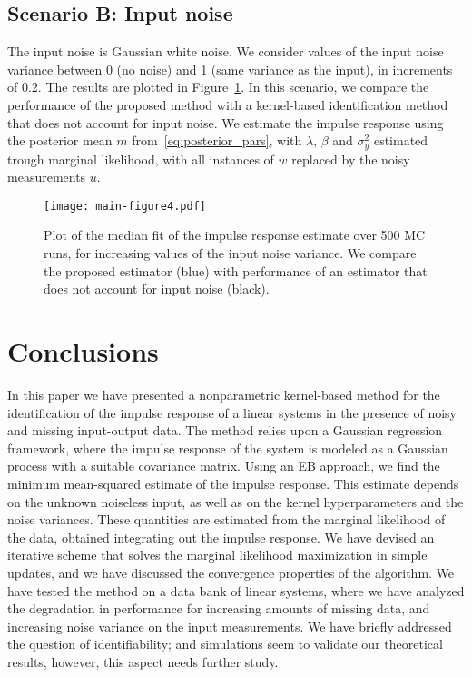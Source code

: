 \documentclass[10pt]{article}
\begin{document}
\subsection*{Scenario B\@: Input noise}
The input noise is Gaussian white noise. We consider values of the input noise
variance between 0 (no noise) and 1 (same variance as the input), in increments
of 0.2. The results are plotted in Figure~\ref{fig:scenario_b}. In this
scenario, we compare the performance of the proposed method with a kernel-based
identification method that does not account for input noise. We estimate the
impulse response using the posterior mean $m$ from~\eqref{eq:posterior_pars},
with $\lambda$, $\beta$ and $\sigma_y^2$ estimated trough marginal likelihood,
with all instances of $w$ replaced by the noisy measurements $u$.
\begin{figure}[htb]
  \centering
  \texttt{[image: main-figure4.pdf]}
  \caption{Plot of the median fit of the impulse response estimate over 500 MC
    runs, for increasing values of the input noise variance. We compare the
    proposed estimator (blue) with performance of an estimator that does not
  account for input noise (black).}\label{fig:scenario_b}
\end{figure}

\section{Conclusions}\label{sec:conclusions}
In this paper we have presented a nonparametric kernel-based method for the
identification of
the impulse response of a linear systems in the presence of noisy and missing input-output
data. The method relies upon a Gaussian regression framework,
where the impulse response of the system is modeled as a Gaussian process with
a suitable covariance matrix. Using an EB approach, we find the minimum
mean-squared estimate of the impulse response. This estimate depends on the
unknown noiseless input, as well as on the kernel hyperparameters and the noise
variances. These quantities are estimated from the marginal likelihood of the data, obtained
integrating out the impulse response. We have devised an iterative scheme that
solves the marginal likelihood maximization in simple updates, and we have discussed
the convergence properties of the algorithm. We have tested the method on a data
bank of linear systems, where we have analyzed the degradation in performance
for increasing amounts of missing data, and increasing noise variance on the input
measurements. We have briefly addressed the question of identifiability; and
simulations seem to validate our theoretical results, however, this aspect
needs further study.



\end{document}
